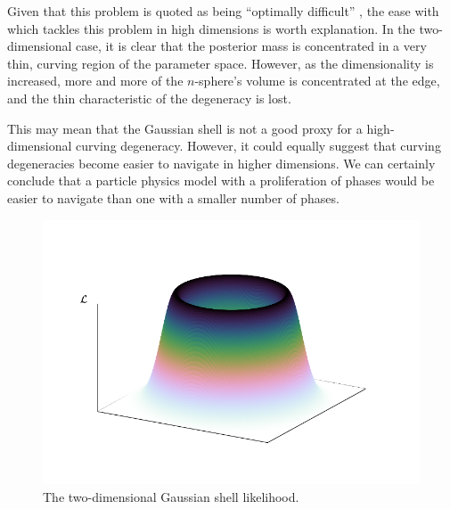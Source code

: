 Given that this problem is quoted as being ``optimally difficult'' \citep{MultiNest2}, the ease with which \PolyChord{} tackles this problem in high dimensions is worth explanation. In the two-dimensional case, it is clear that the posterior mass is concentrated in a very thin, curving region of the parameter space. However, as the dimensionality is increased, more and more of the $n$-sphere's volume is concentrated at the edge, and the thin characteristic of the degeneracy is lost. 

This may mean that the Gaussian shell is not a good proxy for a high-dimensional curving degeneracy. However, it could equally suggest that curving degeneracies become easier to navigate in higher dimensions. We can certainly conclude that a particle physics model with a proliferation of phases would be easier to navigate than one with a smaller number of phases.


\begin{figure}[tp]
  \centering
  \includegraphics[width=\columnwidth]{chapter_polychord/figures/gaussian_shell}
  \caption{The two-dimensional Gaussian shell likelihood.\label{fig:pc:gaussian_shell}}
\end{figure}

